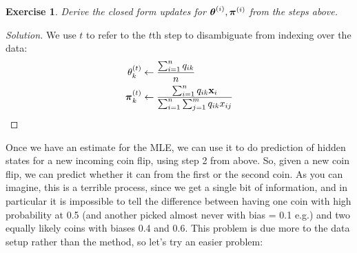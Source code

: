 \documentclass[12pt,letterpaper]{article}
\newtheorem{exercise}{Exercise}
\newenvironment{exercisesolution}
  {\begin{proof}[Solution]}
  {\end{proof}}
\begin{document}
\smallskip

\begin{exercise}
Derive the closed form updates for $\boldsymbol{\theta}^{(i)}, \boldsymbol{\pi}^{(i)}$ from the steps above.
\end{exercise}

\begin{exercisesolution}
We use $t$ to refer to the $t$th step to disambiguate from indexing over the data:
\begin{align*}
	\theta^{(t)}_k &\leftarrow \frac{\sum_{i = 1}^n q_{ik}}{n} \\
	\boldsymbol{\pi}^{(t)}_k &\leftarrow \frac{\sum_{i = 1}^n q_{ik}\mathbf{x}_i}{\sum_{i = 1}^n\sum_{j = 1}^m q_{ik}x_{ij}}
\end{align*}
\end{exercisesolution}

Once we have an estimate for the MLE, we can use it to do prediction of hidden states for a new incoming coin flip, using step 2 from above. So, given a new coin flip, we can predict whether it can from the first or the second coin. As you can imagine, this is a terrible process, since we get a single bit of information, and in particular it is impossible to tell the difference between having one coin with high probability at 0.5 (and another picked almost never with bias = 0.1 e.g.) and two equally likely coins with biases 0.4 and 0.6. This problem is due more to the data setup rather than the method, so let's try an easier problem:
\end{document}
